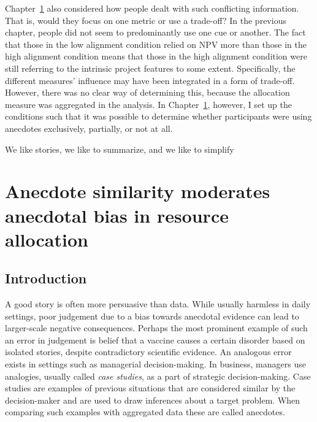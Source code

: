 \documentclass[a4paper, nobind, dvipsnames]{templates/ociamthesis}
\theoremstyle{definition}
\theoremstyle{definition}
\theoremstyle{definition}
\theoremstyle{definition}
\theoremstyle{remark}
\begin{document}
Chapter~\ref{anecdotes} also considered how people dealt with such conflicting
information. That is, would they focus on one metric or use a trade-off? In the
previous chapter, people did not seem to predominantly use one cue or another.
The fact that those in the low alignment condition relied on NPV more than those
in the high alignment condition means that those in the high alignment condition
were still referring to the intrinsic project features to some extent.
Specifically, the different measures' influence may have been integrated in a
form of trade-off. However, there was no clear way of determining this, because
the allocation measure was aggregated in the analysis. In
Chapter~\ref{anecdotes}, however, I set up the conditions such that it was
possible to determine whether participants were using anecdotes exclusively,
partially, or not at all.



\begin{savequote}
We like stories, we like to summarize, and we like to simplify
\end{savequote}

\hypertarget{anecdotes}{%
\chapter{Anecdote similarity moderates anecdotal bias in resource allocation}\label{anecdotes}}

\minitoc

\hypertarget{introduction-3}{%
\section{Introduction}\label{introduction-3}}

A good story is often more persuasive than data. While usually harmless in daily
settings, poor judgement due to a bias towards anecdotal evidence can lead to
larger-scale negative consequences. Perhaps the most prominent example of such
an error in judgement is belief that a vaccine causes a certain disorder based
on isolated stories, despite contradictory scientific evidence. An analogous
error exists in settings such as managerial decision-making. In business,
managers use analogies, usually called \emph{case studies}, as a part of strategic
decision-making. Case studies are examples of previous situations that are
considered similar by the decision-maker and are used to draw inferences about a
target problem. When comparing such examples with aggregated data these are
called anecdotes.
\end{document}
